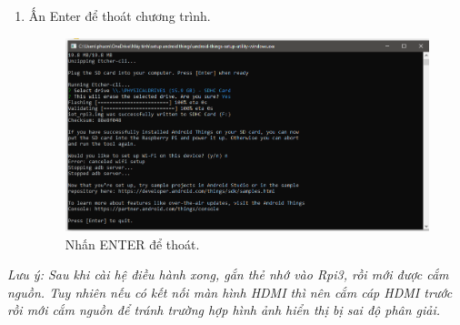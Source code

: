 \begin{enumerate}
\begin{center}
\begin{figure}[htp]
\label{refhinh1}
\end{figure}
\end{center}
\item Ấn Enter để thoát chương trình.
\begin{center}
\begin{figure}[htp]
\begin{center}
\includegraphics[scale=0.53]{image3/buoc2cach2s13.png}
\end{center}
\caption{Nhấn ENTER để thoát.}
\label{refhinh1}
\end{figure}
\end{center}
\end{enumerate}
\textit{\hspace*{0.25cm}Lưu ý: Sau khi cài hệ điều hành xong, gắn thẻ nhớ vào Rpi3, rồi mới được cắm nguồn. Tuy nhiên nếu có kết nối màn hình HDMI thì nên cắm cáp HDMI trước rồi mới cắm nguồn để tránh trường hợp hình ảnh hiển thị bị sai độ phân giải.}\\


